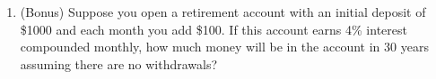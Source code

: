 \documentclass[12pt]{article}
\begin{document}
\begin{enumerate}
\begin{enumerate}
\begin{enumerate}
		\item How long will it take till the balance on the credit card drops below \$1000  assuming no additional purchases are added to the credit card? 
		\vfill
		\item How much in total will have been paid to the credit card company at this point?
		\vfill
		\end{enumerate}
	\item (Bonus) Suppose you open a retirement account with an initial deposit of \$1000 and each month you add \$100. If this account earns 4\% interest compounded monthly, how much money will be in the account in 30 years assuming there are no withdrawals?
	\vfill
	\end{enumerate}

\end{enumerate}
\end{document}

